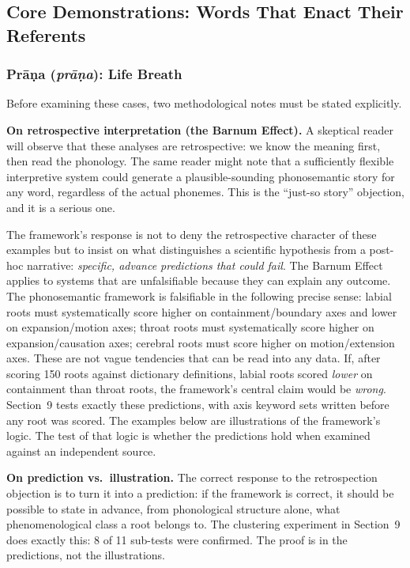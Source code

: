 \documentclass[12pt]{article}
\begin{document}
\subsection{Core Demonstrations: Words That Enact Their Referents}

\subsubsection{Pr\={a}\d{n}a (\textit{pr\={a}\d{n}a}): Life Breath}

Before examining these cases, two methodological notes must be stated explicitly.

\textbf{On retrospective interpretation (the Barnum Effect).} A skeptical reader will observe that these analyses are retrospective: we know the meaning first, then read the phonology. The same reader might note that a sufficiently flexible interpretive system could generate a plausible-sounding phonosemantic story for any word, regardless of the actual phonemes. This is the ``just-so story'' objection, and it is a serious one.

The framework's response is not to deny the retrospective character of these examples but to insist on what distinguishes a scientific hypothesis from a post-hoc narrative: \textit{specific, advance predictions that could fail}. The Barnum Effect applies to systems that are unfalsifiable because they can explain any outcome. The phonosemantic framework is falsifiable in the following precise sense: labial roots must systematically score higher on containment/boundary axes and lower on expansion/motion axes; throat roots must systematically score higher on expansion/causation axes; cerebral roots must score higher on motion/extension axes. These are not vague tendencies that can be read into any data. If, after scoring 150 roots against dictionary definitions, labial roots scored \textit{lower} on containment than throat roots, the framework's central claim would be \textit{wrong}. Section~9 tests exactly these predictions, with axis keyword sets written before any root was scored. The examples below are illustrations of the framework's logic. The test of that logic is whether the predictions hold when examined against an independent source.

\textbf{On prediction vs.~illustration.} The correct response to the retrospection objection is to turn it into a prediction: if the framework is correct, it should be possible to state in advance, from phonological structure alone, what phenomenological class a root belongs to. The clustering experiment in Section~9 does exactly this: 8 of 11 sub-tests were confirmed. The proof is in the predictions, not the illustrations.
\end{document}
